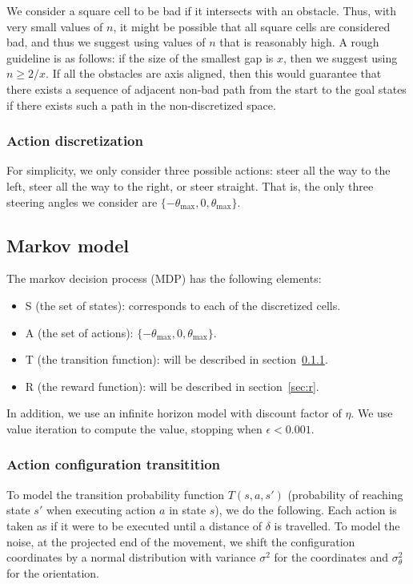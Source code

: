 \documentclass[a4paper]{article}
\begin{document}
We consider a square cell to be bad if it intersects with an obstacle. Thus, with
very small values of $n$, it might be possible that all square cells are considered
bad, and thus we suggest using values of $n$ that is reasonably high. A rough
guideline is as follows: if the size of the smallest gap is $x$, then we
suggest using $n \ge 2/x$. If all the obstacles are axis aligned, then this
would guarantee that there exists a sequence of adjacent non-bad path from the
start to the goal states if there exists such a path in the non-discretized space.

\subsubsection{Action discretization}
For simplicity, we only consider three possible actions: steer all the way
to the left, steer all the way to the right, or steer straight. That is,
the only three steering angles we consider are $\{-\theta_\text{max}, 0, \theta_\text{max}\}$.

\subsection{Markov model}
The markov decision process (MDP) has the following elements:
\begin{itemize}
  \item S (the set of states): corresponds to each of the discretized cells.
  \item A (the set of actions): $\{-\theta_\text{max}, 0, \theta_\text{max}\}$.
  \item T (the transition function): will be described in section~\ref{sec:t}.
  \item R (the reward function): will be described in section~\ref{sec:r}.
\end{itemize}

In addition, we use an infinite horizon model with discount factor of $\eta$.
We use value iteration to compute the value, stopping when $\epsilon < 0.001$.

\subsubsection{Action configuration transitition}
\label{sec:t}
To model the transition probability function $T(s, a, s')$ (probability of
reaching state $s'$ when executing action $a$ in state $s$), we do the following.
Each action is taken as if it were to be executed until a distance of $\delta$
is travelled. To model the noise, at the projected end of the movement, we
shift the configuration coordinates by a normal distribution with variance
$\sigma^2$ for the coordinates and $\sigma_\theta^2$ for the orientation.
\end{document}
